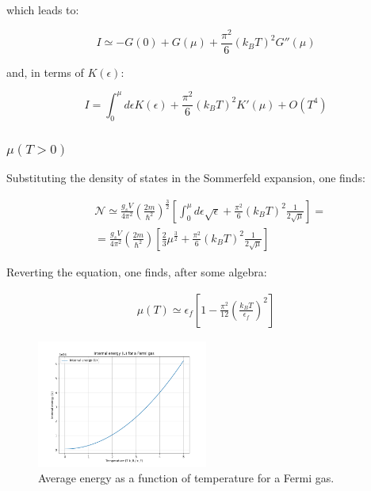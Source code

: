 \documentclass{article}
\begin{document}
which leads to:

\begin{equation}
    I\simeq -G(0)+G(\mu)+\frac{\pi^2}{6}(k_BT)^2G''(\mu)
\end{equation}

and, in terms of $K(\epsilon)$:

\begin{equation}
    I=\int_0^\mu d\epsilon K(\epsilon)+\frac{\pi^2}{6}(k_BT)^2K'(\mu)+O(T^4)
\end{equation}

\subsubsection{$\mu(T>0)$}

Substituting the density of states in the Sommerfeld expansion, one finds:

\begin{equation}
    \begin{aligned}
         & \mathcal{N}\simeq \frac{g_sV}{4\pi^2}\left(\frac{2m}{\hbar^2}\right)^{\frac{3}{2}}\left[\int_0^\mu d\epsilon \sqrt{\epsilon}+\frac{\pi^2}{6}(k_BT)^2\frac{1}{2\sqrt{\mu}}\right]= \\
         & =\frac{g_s V}{4\pi^2}\left(\frac{2m}{\hbar^2}\right)\left[\frac{2}{3}\mu^{\frac{3}{2}}+\frac{\pi^2}{6}(k_BT)^2\frac{1}{2\sqrt{\mu}}\right]
    \end{aligned}
\end{equation}

Reverting the equation, one finds, after some algebra:

\begin{tcolorbox}[colframe=gray!50, colback=gray!10, coltitle=black, title= $\mu(T>0)$]

    \begin{equation}
        \begin{aligned}
            \mu(T)\simeq \epsilon_f\left[1-\frac{\pi^2}{12}\left(\frac{k_BT}{\epsilon_f}\right)^2\right]
        \end{aligned}
    \end{equation}
\end{tcolorbox}


\begin{figure}[h]
    \centering
    \includegraphics[width=0.5\textwidth]{images/u-fermions.png}
    \caption{Average energy as a function of temperature for a Fermi gas.}
    \label{fig:u-fermions}
\end{figure}
\end{document}
